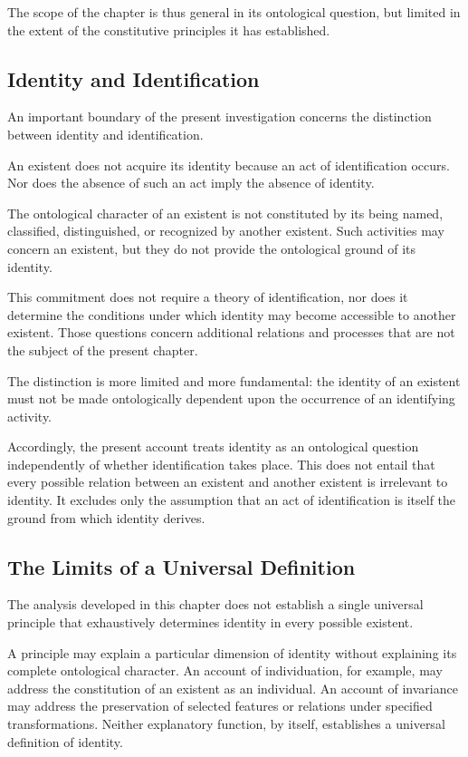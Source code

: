 The scope of the chapter is thus general in its ontological
question, but limited in the extent of the constitutive
principles it has established.

\subsection{Identity and Identification}

An important boundary of the present investigation concerns
the distinction between identity and identification.

An existent does not acquire its identity because an act
of identification occurs. Nor does the absence of such an
act imply the absence of identity.

The ontological character of an existent is not constituted
by its being named, classified, distinguished, or recognized
by another existent. Such activities may concern an
existent, but they do not provide the ontological ground
of its identity.

This commitment does not require a theory of identification,
nor does it determine the conditions under which identity
may become accessible to another existent. Those questions
concern additional relations and processes that are not
the subject of the present chapter.

The distinction is more limited and more fundamental:
the identity of an existent must not be made ontologically
dependent upon the occurrence of an identifying activity.

Accordingly, the present account treats identity as an
ontological question independently of whether identification
takes place. This does not entail that every possible
relation between an existent and another existent is
irrelevant to identity. It excludes only the assumption
that an act of identification is itself the ground from
which identity derives.

\subsection{The Limits of a Universal Definition}

The analysis developed in this chapter does not establish
a single universal principle that exhaustively determines
identity in every possible existent.

A principle may explain a particular dimension of identity
without explaining its complete ontological character.
An account of individuation, for example, may address the
constitution of an existent as an individual. An account
of invariance may address the preservation of selected
features or relations under specified transformations.
Neither explanatory function, by itself, establishes
a universal definition of identity.

